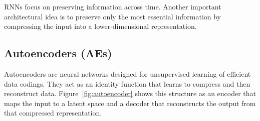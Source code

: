RNNs focus on preserving information across time.
Another important architectural idea is to preserve only the most essential information by compressing the input into a lower-dimensional representation.

\subsection{Autoencoders (AEs)}

Autoencoders are neural networks designed for unsupervised learning of efficient data codings. They act as an identity function that learns to compress and then reconstruct data. Figure~\ref{fig:autoencoder} shows this structure as an encoder that maps the input to a latent space and a decoder that reconstructs the output from that compressed representation.

